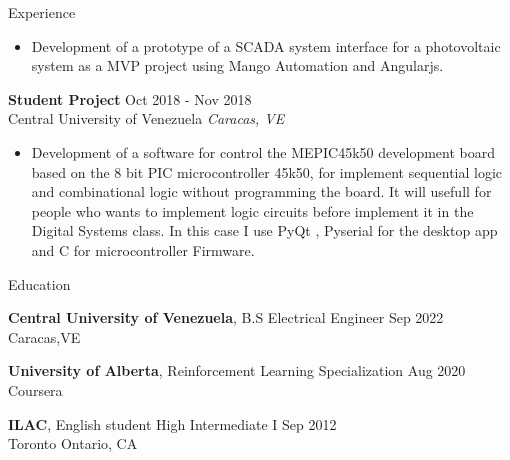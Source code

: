 \documentclass{resume} %
\begin{document}
\begin{rSection}{Experience}
\begin{itemize}
        \item Development of a prototype of a SCADA system interface for a 
        photovoltaic system as a MVP project using Mango Automation and Angularjs.

    \end{itemize}

    \textbf{Student Project} \hfill Oct 2018 - Nov 2018\\
    Central University of Venezuela \hfill \textit{Caracas, VE}
    \begin{itemize}

        \item Development of a software for control the MEPIC45k50 development 
        board based on the 8 bit PIC microcontroller 45k50, for implement sequential 
        logic and combinational logic without programming the board. It will 
        usefull for people who wants to implement logic circuits before 
        implement it in the Digital Systems class. In this case I use PyQt , 
        Pyserial for the desktop app and C for microcontroller Firmware. 

    \end{itemize}




\end{rSection}


\begin{rSection}{Education} %

    \textbf{Central University of Venezuela}, B.S Electrical Engineer 
    \hfill {Sep 2022} \\ \hfill{Caracas,VE}

    \textbf{University of Alberta}, Reinforcement Learning Specialization  
    \hfill {Aug 2020} \\ 
    \hfill{Coursera}

    \textbf{ILAC}, English student High Intermediate I \hfill {Sep 2012} \\ 
    \hfill{Toronto Ontario, CA}

\end{rSection}
\end{document}
